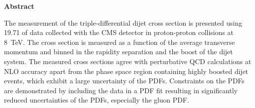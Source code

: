 \thispagestyle{plain}
\begin{center}
    \LARGE{\textbf{Abstract}}\\[2em]
\end{center}
    \normalsize
    The measurement of the triple-differential dijet cross section is presented
    using \SI{19.71}{\fbinv} of data collected with the CMS detector in
    proton-proton collisions at \SI{8}{\TeV}. The cross section is measured  as a function
    of the average transverse momentum and binned in the rapidity separation and
    the boost of the dijet system. The measured cross sections agree with
    perturbative QCD calculations at NLO accuracy apart from the phase space
    region containing highly boosted dijet events, which exhibit a large
    uncertainty of the PDFs. Constraints on the PDFs are demonstrated by
    including the data in a PDF fit resulting in significantly reduced
    uncertainties of the PDFs, especially the gluon PDF.
    \vspace{1ex}


\cleardoublepage

